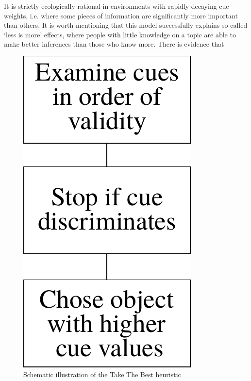 It is strictly ecologically rational in environments with rapidly decaying cue weights, i.e. where some pieces of information are significantly more important than others. It is worth mentioning that this model successfully explains so called `less is more' effects, where people with little knowledge on a topic are able to make better inferences than those who know more. There is evidence \citep{Garcia-Retamero2009,Pachur2013} that
\begin{figure}
  \centering
  \includegraphics[width = .2 \textwidth]{figures/TTB.pdf}
  \caption{Schematic illustration of the Take The Best heuristic}
  \label{TTB}
\end{figure}
